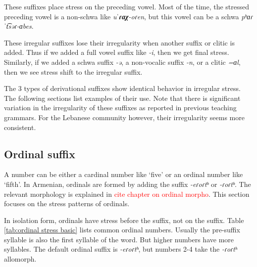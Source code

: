 These suffixes place stress on the preceding vowel. Most of the time, the stressed preceding vowel is a non-schwa like \textit{uˈ\textbf{ɾɑχ}-oɾen}, but this vowel can be a schwa \textit{pʰɑɾˈt͡səɾ-ɑbes}. 

These irregular suffixes lose their irregularity when another suffix or clitic is added. Thus if we added a full vowel suffix like \textit{-i}, then we get final stress. Similarly, if we added a schwa suffix \textit{-ə}, a non-vocalic suffix \textit{-n}, or a clitic \textit{=ɑl}, then we see stress shift to the irregular suffix. 

The 3 types of derivational suffixes show identical behavior in irregular stress. The following sections list examples of their use. Note that there is significant variation in the irregularity of these suffixes as reported in previous teaching grammars. For the Lebanese community however, their irregularity seems more consistent. 


\subsection{Ordinal suffix}\label{section:stress:prestress:ordinal}
A number can be either a cardinal number like `five' or an ordinal number like `fifth'. In Armenian, ordinals are formed by adding the suffix \textit{-eɾoɾtʰ} or \textit{-ɾoɾtʰ}. The relevant morphology is explained in \textcolor{red}{cite chapter    on ordinal morpho}. This section focuses on the stress patterns of ordinals. 

In isolation form, ordinals have   stress before the suffix, not on the suffix. Table \ref{tab:ordinal stress basic} lists common ordinal numbers. Usually the pre-suffix syllable is also the first syllable of the word. But higher numbers have more syllables. The default ordinal suffix is \textit{-eɾoɾtʰ}, but numbers 2-4 take the  \textit{-ɾoɾtʰ} allomorph. 

